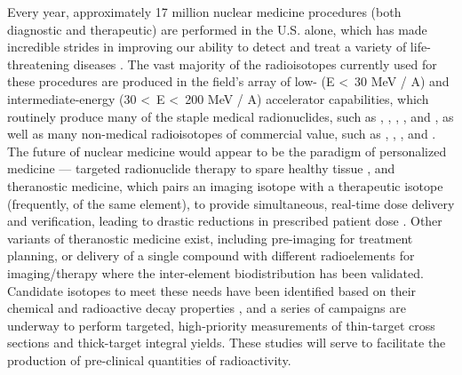 \documentclass[%
 reprint,
superscriptaddress,
onecolumn,
linenumbers,
notitlepage,
 amsmath,amssymb,
 aps,
prc,
]{revtex4-1}
\newcommand{\comment}[1]{\todo[color=blue!20!white,inline]{ASV: #1}}
\begin{document}
Every year, approximately 17 million nuclear medicine procedures (both diagnostic and therapeutic) are performed in the U.S. alone,  which has made incredible strides in improving our ability to detect and treat a variety of life-threatening diseases \cite{Delbeke2011,NSACIsotopesSubcommittee2015}.
The vast majority of the radioisotopes currently used for these procedures are produced in the field's array of low- (E \textless\ 30 MeV / A) and intermediate-energy (30 \textless\ E \textless\ 200 MeV / A) accelerator capabilities, which routinely produce many of the staple medical radionuclides, such as , , , , and , as well as many  
non-medical radioisotopes of commercial value, such as  , , , and   \cite{international2009iaea,schlyer2008cyclotron}. 
The future of nuclear medicine would appear to be the paradigm of personalized medicine --- targeted radionuclide therapy to spare healthy tissue \cite{Mulford2005,Qaim201731}, and theranostic medicine, which pairs an imaging isotope with a therapeutic isotope (frequently, of the same element), to provide simultaneous, real-time dose delivery and verification, leading to drastic reductions in prescribed patient dose \cite{Muller2014,Bentzen2005,Srivastava2012}. 
Other variants of theranostic medicine exist, including pre-imaging for treatment planning, or delivery of a single compound with different radioelements for imaging/therapy where the inter-element biodistribution has been validated.  
Candidate isotopes to meet these needs have been identified based on their chemical and radioactive decay properties \cite{NSACIsotopesSubcommittee2015,Qaim201731,bernstein2015nuclear}, and a series of campaigns are underway to perform targeted, high-priority measurements of thin-target cross sections and thick-target integral yields.
These studies will serve to facilitate the production of pre-clinical quantities of radioactivity.
\end{document}
